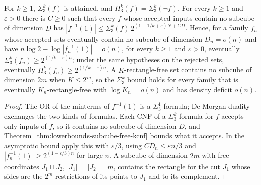 \begin{theorem}
  \label{thm:lowerbounds-depth-three-dispersers}
  \leanok
  For $k\ge1$, $\Sigma_3^k(f)$ is attained, and $\Pi_3^k(f)=\Sigma_3^k(\neg f)$.
  For every $k\ge1$ and $\varepsilon>0$ there is $C\ge0$ such that every $f$ whose
  accepted inputs contain no subcube of dimension $D$ has
  $|f^{-1}(1)|\le\Sigma_3^k(f)\,2^{(1-1/k+\varepsilon)N+CD}$. Hence, for a family
  $f_n$ whose accepted sets eventually contain no subcube of dimension
  $D_n=o(n)$ and have $n\log2-\log|f_n^{-1}(1)|=o(n)$, for every $k\ge1$ and
  $\varepsilon>0$, eventually $\Sigma_3^k(f_n)\ge2^{(1/k-\varepsilon)n}$; under
  the same hypotheses on the rejected sets, eventually
  $\Pi_3^k(f_n)\ge2^{(1/k-\varepsilon)n}$. A $K$-rectangle-free set contains no
  subcube of dimension $2m$ when $K\le2^m$, so the $\Sigma_3^k$ bound holds for
  every family that is eventually $K_n$-rectangle-free with $\log K_n=o(n)$ and
  has density deficit $o(n)$.
\end{theorem}
\begin{proof}
  \leanok
  The OR of the minterms of $f^{-1}(1)$ is a $\Sigma_3^1$ formula; De Morgan
  duality exchanges the two kinds of formulas. Each CNF of a $\Sigma_3^k$ formula
  for $f$ accepts only inputs of $f$, so it contains no subcube of dimension $D$,
  and Theorem~\ref{thm:lowerbounds-subcube-free-kcnf} bounds what it accepts. In
  the asymptotic bound apply this with $\varepsilon/3$, using $CD_n\le\varepsilon
  n/3$ and $|f_n^{-1}(1)|\ge2^{(1-\varepsilon/3)n}$ for large $n$. A subcube of
  dimension $2m$ with free coordinates $J_1\sqcup J_2$, $|J_1|=|J_2|=m$, contains
  the rectangle for the cut $J_1$ whose sides are the $2^m$ restrictions of its
  points to $J_1$ and to its complement.
\end{proof}

